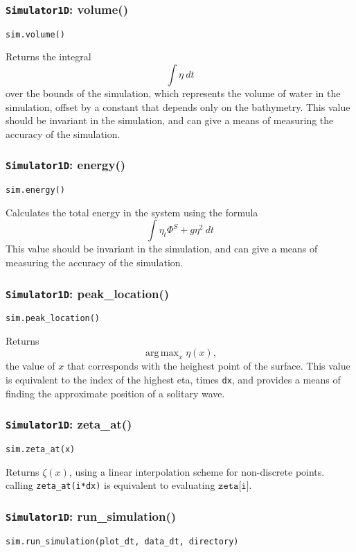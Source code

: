 \documentclass[10pt,a4paper]{article}
\DeclareMathOperator*{\argmax}{arg\,max}
\begin{document}
\subsubsection{\texttt{Simulator1D}: volume()}
\texttt{sim.volume()}

Returns the integral
$$\int \eta~dt$$
over the bounds of the simulation, which represents the volume of water in the simulation, offset by a constant that depends only on the bathymetry. This value should be invariant in the simulation, and can give a means of measuring the accuracy of the simulation.




\subsubsection{\texttt{Simulator1D}: energy()}
\texttt{sim.energy()}

Calculates the total energy in the system using the formula
$$\int \eta_t\Phi^S + g\eta^2~dt$$
This value should be invariant in the simulation, and can give a means of measuring the accuracy of the simulation.



\subsubsection{\texttt{Simulator1D}: peak\_location()}
\texttt{sim.peak\_location()}

Returns $$\argmax_{x} \eta(x),$$ the value of $x$ that corresponds with the heighest point of the surface. This value is equivalent to the index of the highest eta, times \texttt{dx}, and provides a means of finding the approximate position of a solitary wave.



\subsubsection{\texttt{Simulator1D}: zeta\_at()}
\texttt{sim.zeta\_at(x)}

Returns $\zeta(x)$, using a linear interpolation scheme for non-discrete points. calling \texttt{zeta\_at(i*dx)} is equivalent to evaluating $\texttt{zeta[i]}$.




\subsubsection{\texttt{Simulator1D}: run\_simulation()}
\texttt{sim.run\_simulation(plot\_dt, data\_dt, directory)}
\end{document}
